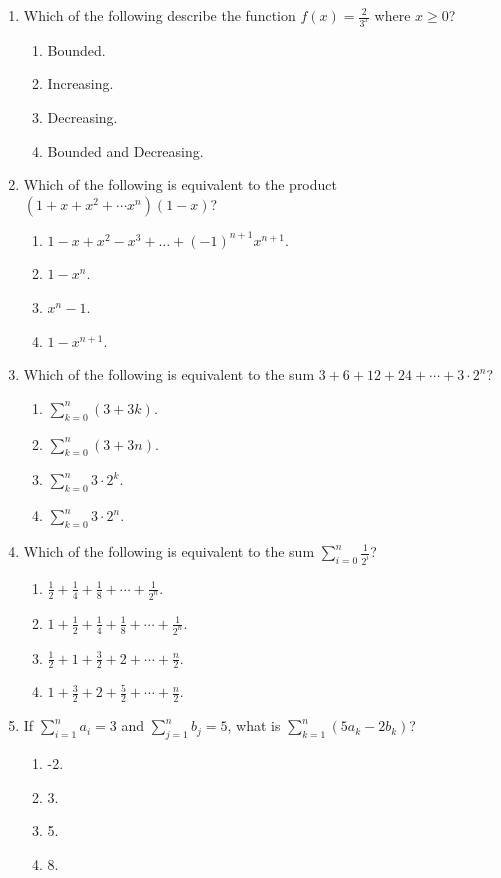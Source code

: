 \documentclass{article}
\begin{document}
\begin{enumerate}
  
  \item Which of the following describe the function $f(x)=\frac{2}{3^x}$ where $x\geq 0$?
  \begin{enumerate}
    \item Bounded. 
    \item Increasing. 
    \item Decreasing.
    \item Bounded and Decreasing. %
  \end{enumerate}

  \item Which of the following is equivalent to the product $(1+x+x^2+\cdots x^n)(1-x)$?
  \begin{enumerate}
    \item $1-x+x^2-x^3+\dots+(-1)^{n+1}x^{n+1}$. 
    \item $1-x^n$. 
    \item $x^n-1$.
    \item $1-x^{n+1}$. %
  \end{enumerate}
  
  \item Which of the following is equivalent to the sum $3+6+12+24+\cdots+3\cdot 2^n$?
  \begin{enumerate}
    \item $\sum_{k=0}^n (3+3k)$. 
    \item $\sum_{k=0}^n (3+3n)$. 
    \item $\sum_{k=0}^n 3\cdot2^k$. %
    \item $\sum_{k=0}^n 3\cdot2^n$.
  \end{enumerate}
  
  
  \item Which of the following is equivalent to the sum $\sum_{i=0}^n\frac{1}{2^i}$?
  \begin{enumerate}
    \item $\frac{1}{2}+\frac{1}{4}+\frac{1}{8}+\cdots+\frac{1}{2^n}$. 
    \item $1+\frac{1}{2}+\frac{1}{4}+\frac{1}{8}+\cdots+\frac{1}{2^n}$. %
    \item $\frac{1}{2}+1+\frac{3}{2}+2+\cdots+\frac{n}{2}$.
    \item $1+\frac{3}{2}+2+\frac{5}{2}+\cdots+\frac{n}{2}$.
  \end{enumerate}
  
  \item If $\sum_{i=1}^n a_i=3$ and $\sum_{j=1}^n b_j=5$, what is $\sum_{k=1}^n (5a_k-2b_k)$?
  \begin{enumerate}
    \item -2. 
    \item 3.
    \item 5. %
    \item 8.
  \end{enumerate}

  
  
  
    
\end{enumerate}
\end{document}
